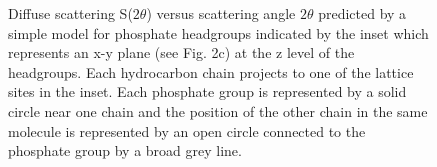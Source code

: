 \begin{figure}
\centerline {}
\caption{Diffuse scattering S($2 \theta$) versus scattering angle $2 \theta$ 
predicted by a simple model for phosphate headgroups indicated by the inset
which represents an x-y plane (see Fig. 2c) at the z level of the headgroups.
Each hydrocarbon chain projects to one of the lattice sites in the
inset.  Each phosphate group is represented by a solid circle near one 
chain and 
the position of the other chain in the same molecule is 
represented by an open circle connected to the phosphate group by a 
broad grey line. 
\label{fig6}}
\end{figure}
